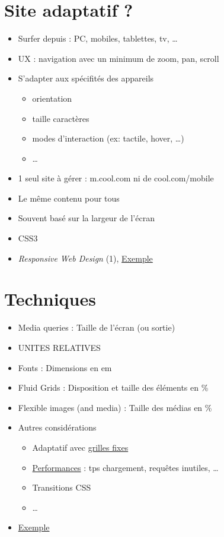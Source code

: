 \hypertarget{site-adaptatif}{%
\section{Site adaptatif ?}\label{site-adaptatif}}

\begin{itemize}
\tightlist
\item
  Surfer depuis : PC, mobiles, tablettes, tv, \ldots{}
\item
  UX : navigation avec un minimum de zoom, pan, scroll
\item
  S'adapter aux spécifités des appareils

  \begin{itemize}
  \tightlist
  \item
    orientation
  \item
    taille caractères
  \item
    modes d'interaction (ex: tactile, hover, \ldots{})
  \item
    \ldots{}
  \end{itemize}
\item
  1 seul site à gérer : m.cool.com ni de cool.com/mobile
\item
  Le même contenu pour tous
\item
  Souvent basé sur la largeur de l'écran
\item
  CSS3
\item
  \emph{Responsive Web Design} (1),
  \href{http://alistapart.com/d/responsive-web-design/ex/ex-site-FINAL.html}{Exemple}
\end{itemize}

\hypertarget{techniques}{%
\section{Techniques}\label{techniques}}

\begin{itemize}
\tightlist
\item
  Media queries : Taille de l'écran (ou sortie)
\item
  UNITES RELATIVES
\item
  Fonts : Dimensions en em
\item
  Fluid Grids : Disposition et taille des éléments en \%
\item
  Flexible images (and media) : Taille des médias en \%
\item
  Autres considérations

  \begin{itemize}
  \tightlist
  \item
    Adaptatif avec \href{http://www.jonikorpi.com/frameless/}{grilles
    fixes}
  \item
    \href{https://browserdiet.com/}{Performances} : tps chargement,
    requêtes inutiles, \ldots{}
  \item
    Transitions CSS
  \item
    \ldots{}
  \end{itemize}
\item
  \href{http://webdesignerwall.com/tutorials/responsive-design-in-3-steps}{Exemple}
\end{itemize}

